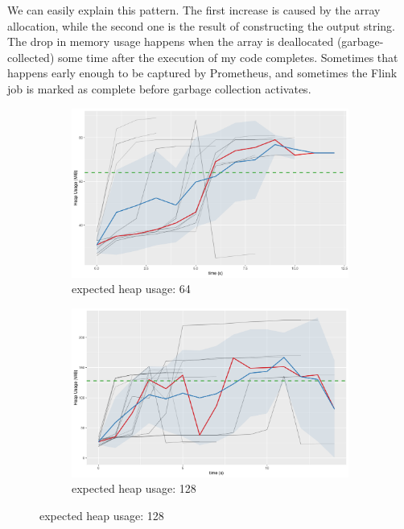 \documentclass{article}
\begin{document}
We can easily explain this pattern. The first increase is caused by the array
allocation, while the second one is the result of constructing the output
string. The drop in memory usage happens when the array is deallocated
(garbage-collected) some time after the execution of my code completes.
Sometimes that happens early enough to be captured by Prometheus, and sometimes
the Flink job is marked as complete before garbage collection activates.

\begin{figure}
  \centering
  \begin{subfigure}[t]{0.49\textwidth}
    \centering
    \includegraphics[width=\textwidth]{../plots/heap_64.png}
    \caption{expected heap usage: \SI{64}{\mebi\byte}}
    \label{fig:heap_64}
  \end{subfigure}
  \begin{subfigure}[t]{0.49\textwidth}
    \centering
    \includegraphics[width=\textwidth]{../plots/heap_128.png}
    \caption{expected heap usage: \SI{128}{\mebi\byte}}

\end{subfigure}
\end{figure}
\end{document}
